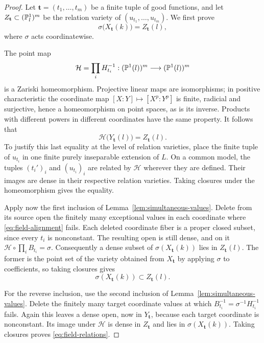 \begin{proof}
Let \(\mathbf t=(t_1,\ldots,t_m)\) be a finite tuple of good functions,
and let \(Z_{\mathbf t}\subset(\mathbb P^1_l)^m\) be the relation variety of
\((u_{t_1},\ldots,u_{t_m})\).  We first prove
\begin{equation}\label{eq:field-relations}
 \sigma\bigl(X_{\mathbf t}(k)\bigr)=Z_{\mathbf t}(l),
\end{equation}
where \(\sigma\) acts coordinatewise.

The point map
\[
 \mathcal H=\prod_i H_{t_i}^{-1}:
 (\mathbb P^1(l))^m\longrightarrow(\mathbb P^1(l))^m
\]
is a Zariski homeomorphism.  Projective linear maps are isomorphisms; in
positive characteristic the coordinate map
\([X:Y]\mapsto[X^p:Y^p]\) is finite, radicial and surjective, hence a
homeomorphism on point spaces, as is its inverse.
Products with different powers in different coordinates have the same
property.  It follows that
\[
 \mathcal H\bigl(Y_{\mathbf t}(l)\bigr)=Z_{\mathbf t}(l).
\]
To justify this last equality at the level of relation varieties, place
the finite tuple of \(u_{t_i}\) in one finite purely inseparable extension
of \(L\).  On a common model, the tuples \((t_i')_i\) and
\((u_{t_i})_i\) are related by \(\mathcal H\) wherever they are defined.
Their images are dense in their respective relation varieties.
Taking closures under the homeomorphism gives the equality.

Apply now the first inclusion of
Lemma~\ref{lem:simultaneous-values}.  Delete from its source open the
finitely many exceptional values in each coordinate where
\eqref{eq:field-alignment} fails.  Each deleted coordinate fiber is a
proper closed subset, since every \(t_i\) is nonconstant.  The resulting
open is still dense, and on it
\(\mathcal H\circ\prod_iB_{t_i}=\sigma\).
Consequently a dense subset of \(\sigma(X_{\mathbf t}(k))\) lies in
\(Z_{\mathbf t}(l)\).  The former is the point set of the variety obtained
from \(X_{\mathbf t}\) by applying \(\sigma\) to coefficients, so taking
closures gives
\[
 \sigma(X_{\mathbf t}(k))\subset Z_{\mathbf t}(l).
\]

For the reverse inclusion, use the second inclusion of
Lemma~\ref{lem:simultaneous-values}.  Delete the finitely many target
coordinate values at which
\(B_{t_i}^{-1}=\sigma^{-1}H_{t_i}^{-1}\) fails.  Again this leaves a
dense open, now in \(Y_{\mathbf t}\), because each target coordinate is
nonconstant.  Its image under \(\mathcal H\) is dense in
\(Z_{\mathbf t}\) and lies in \(\sigma(X_{\mathbf t}(k))\).
Taking closures proves \eqref{eq:field-relations}.


\end{proof}
